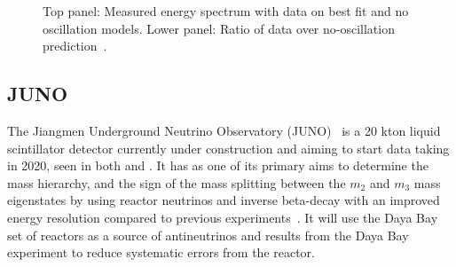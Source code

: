 \begin{figure}[h!]
\begin{minipage}[b]{0.49\textwidth}
       \vspace{2mm}
    \caption{Top panel: Measured energy spectrum with data on best fit and no oscillation models. Lower panel: Ratio of data over no-oscillation prediction~\cite{72Double}.}
     \label{fig:dc2}
  \end{minipage}
\end{figure}

\subsection{JUNO}

The Jiangmen Underground Neutrino Observatory (JUNO)~\cite{75Juno} is a 20 kton liquid scintillator detector currently under construction and aiming to start data taking in 2020, seen in both  and . It has as one of its primary aims to determine the mass hierarchy, and the sign of the mass splitting between the $m_2$ and $m_3$ mass eigenstates by using reactor neutrinos and inverse beta-decay with an improved energy resolution compared to previous experiments~\cite{75Juno}. It will use the Daya Bay set of reactors as a source of antineutrinos and results from the Daya Bay experiment to reduce systematic errors from the reactor.

